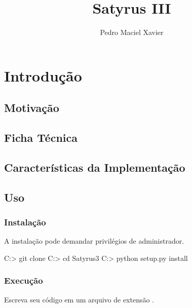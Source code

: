 \documentclass[12pt]{satyrus}
\title{Satyrus III}
\author{Pedro Maciel Xavier}
\begin{document}
    \maketitle
    
    \newpage

    \tableofcontents

    \chapter{Introdução}
    
    \section{Motivação}

    \section{Ficha Técnica}

    \section{Características da Implementação}

    \section{Uso}
    
    \subsection{Instalação}
    
    A instalação pode demandar privilégios de administrador.
    
	
	\begin{shell}
	C:\Users\User> git clone
	C:\Users\User> cd Satyrus3
	C:\Users\User{}> python setup.py install
	\end{shell}

    \subsection{Execução}
    
    Escreva seu código em um arquivo de extensão .
    
\end{document}
